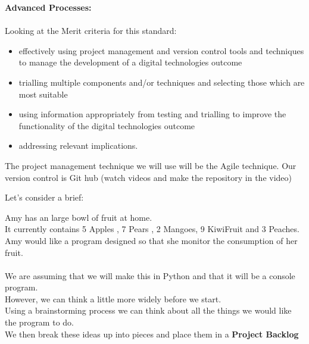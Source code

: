 \documentclass[a4paper,12pt]{article}
\begin{document}
	\Large \textbf{Advanced Processes:}\normalsize\\\\
Looking at the Merit criteria for this standard:
\begin{itemize}
	\item 	effectively using project management and version control tools and techniques to manage the development of a digital technologies outcome
	\item trialling multiple components and/or techniques and selecting those which are
	most suitable
	\item using information appropriately from testing and trialling to improve the
	functionality of the digital technologies outcome
	\item addressing relevant implications.
\end{itemize}
The project management technique we will use will be the Agile technique.
Our version control is Git hub (watch videos and make the repository in the video)


	
	
	
	Let's consider a brief:
	
	Amy has an  large bowl of fruit at home.\\
	It currently contains 5 Apples , 7 Pears , 2 Mangoes, 9 KiwiFruit and 3 Peaches.\\
	Amy would like a program designed so that she monitor the consumption of her fruit.\\\\
	
	We are assuming that we will make this in Python and that it will be a console program.\\
	However, we can think a little more widely before we start.\\
	Using a brainstorming process we can think about all the things we would like the program to do.\\
	We then break these ideas up into pieces and place them in a \textbf{Project Backlog}
	\newpage
\end{document}
